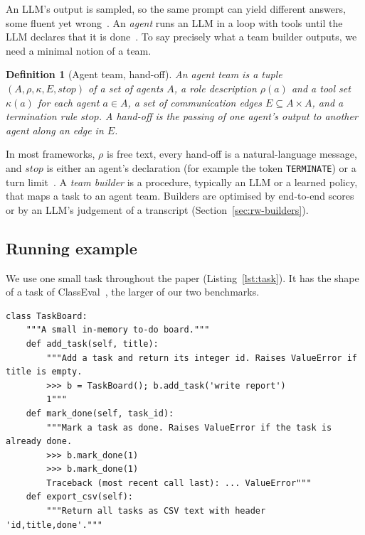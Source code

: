 \documentclass[pdflatex,sn-mathphys-num]{sn-jnl}
\theoremstyle{thmstyleone}%
\theoremstyle{thmstyletwo}%
\theoremstyle{thmstylethree}%
\newtheorem{definition}{Definition}%
\newcommand{\code}[1]{\texttt{#1}}
\begin{document}
An LLM's output is sampled, so the same prompt can yield different answers,
some fluent yet wrong~\cite{ouyang2025nondeterminism,sallou2024breaking}. An
\emph{agent} runs an LLM in a loop with tools until the LLM declares that it is
done~\cite{wu2024autogen,yang2024sweagent}. To say precisely what a team
builder outputs, we need a minimal notion of a team.

\begin{definition}[Agent team, hand-off]\label{def:team}
An agent team is a tuple $(A,\rho,\kappa,E,\mathit{stop})$ of a set of agents
$A$, a role description $\rho(a)$ and a tool set $\kappa(a)$ for each agent
$a\in A$, a set of communication edges $E\subseteq A\times A$, and a
termination rule $\mathit{stop}$. A \emph{hand-off} is the passing of one
agent's output to another agent along an edge in $E$.
\end{definition}

In most frameworks, $\rho$ is free text, every hand-off is a natural-language
message, and $\mathit{stop}$ is either an agent's declaration (for example the
token \code{TERMINATE}) or a turn limit~\cite{wu2024autogen,song2024captain}.
A \emph{team builder} is a procedure, typically an LLM or a learned policy,
that maps a task to an agent team. Builders are optimised by end-to-end scores
or by an LLM's judgement of a transcript (Section~\ref{sec:rw-builders}).

\subsection{Running example}\label{sec:example}

We use one small task throughout the paper (Listing~\ref{lst:task}). It has
the shape of a task of ClassEval~\cite{du2024classeval}, the larger of our two
benchmarks.

\begin{lstlisting}[float=tb, style=raw, caption={Raw input: the \code{TaskBoard} task as given to every condition (abridged).}, label={lst:task}]
class TaskBoard:
    """A small in-memory to-do board."""
    def add_task(self, title):
        """Add a task and return its integer id. Raises ValueError if title is empty.
        >>> b = TaskBoard(); b.add_task('write report')
        1"""
    def mark_done(self, task_id):
        """Mark a task as done. Raises ValueError if the task is already done.
        >>> b.mark_done(1)
        >>> b.mark_done(1)
        Traceback (most recent call last): ... ValueError"""
    def export_csv(self):
        """Return all tasks as CSV text with header 'id,title,done'."""
\end{lstlisting}
\end{document}
